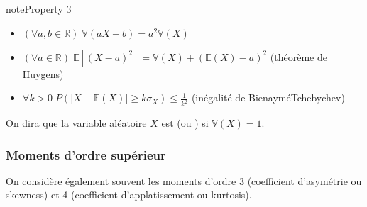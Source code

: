 \documentclass[letterpaper,10pt,english]{jupyterBook}
\begin{document}
\begin{sphinxadmonition}{note}{Property 3}


\begin{itemize}
\item {} 
\sphinxAtStartPar
\((\forall a,b\in\mathbb{R})\; \mathbb{V}(aX+b)= a^2\mathbb{V}(X)\)

\item {} 
\sphinxAtStartPar
\((\forall a\in\mathbb{R})\; \mathbb{E}\left [(X-a)^2\right ] = \mathbb V(X) +(\mathbb{E}(X)-a)^2\) (théorème de Huygens)

\item {} 
\sphinxAtStartPar
\(\forall k>0\; P(|X-\mathbb{E}(X)|\geq k\sigma_X)\leq \frac{1}{k^2}\) (inégalité de Bienaymé\sphinxhyphen{}Tchebychev)

\end{itemize}
\end{sphinxadmonition}

\sphinxAtStartPar
On dira que la variable aléatoire \(X\) est  (ou ) si \(\mathbb{V}(X)=1\).


\subsubsection{Moments d’ordre supérieur}
\label{\detokenize{Rappels:moments-d-ordre-superieur}}
\ignorespaces 
{}\ignorespaces 
\sphinxAtStartPar
On considère également souvent les moments d’ordre 3 (coefficient d’asymétrie ou skewness) et 4 (coefficient d’applatissement ou kurtosis).

\sphinxstepscope
\end{document}
